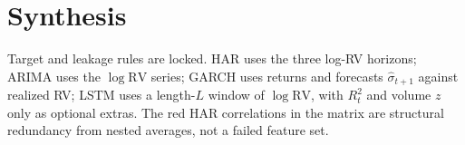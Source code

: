 \documentclass[12pt]{article}
\begin{document}
\section{Synthesis}
Target and leakage rules are locked.
HAR uses the three log-RV horizons; ARIMA uses the \(\log\mathrm{RV}\) series; GARCH uses returns and forecasts \(\hat\sigma_{t+1}\) against realized RV; LSTM uses a length-\(L\) window of \(\log\mathrm{RV}\), with \(R_t^2\) and volume \(z\) only as optional extras.
The red HAR correlations in the matrix are structural redundancy from nested averages, not a failed feature set.
\end{document}
